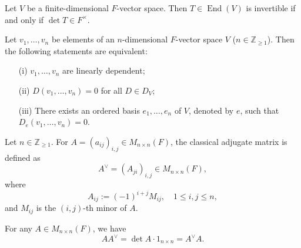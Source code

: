 \begin{proposition}
Let $V$ be a finite-dimensional $F$-vector space. Then $T \in \operatorname{End}(V)$ is invertible if and only if $\det T \in F^\times$.
\end{proposition}

\begin{corollary}
Let $v_1, \ldots, v_n$ be elements of an $n$-dimensional $F$-vector space $V$ ($n \in \mathbb{Z}_{\geq 1}$). Then the following statements are equivalent:
\begin{itemize}
    \item[(i)] $v_1, \ldots, v_n$ are linearly dependent;
    \item[(ii)] $D(v_1, \ldots, v_n) = 0$ for all $D \in D_V$;
    \item[(iii)] There exists an ordered basis $e_1, \ldots, e_n$ of $V$, denoted by $e$, such that $D_e(v_1, \ldots, v_n) = 0$.
\end{itemize}
\end{corollary}

\begin{definition}
Let $n \in \mathbb{Z}_{\geq 1}$. For $A = (a_{ij})_{i,j} \in M_{n \times n}(F)$, the classical adjugate matrix is defined as
\[
A^\vee = (A_{ji})_{i,j} \in M_{n \times n}(F),
\]
where
\[
A_{ij} := (-1)^{i+j} M_{ij}, \quad 1 \leq i, j \leq n,
\]
and $M_{ij}$ is the $(i,j)$-th minor of $A$.
\end{definition}

\begin{theorem}
For any $A \in M_{n \times n}(F)$, we have
\[
A A^\vee = \det A \cdot 1_{n \times n} = A^\vee A.
\]
\end{theorem}

